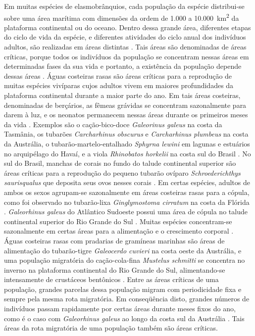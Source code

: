 \documentclass[a4paper,11pt,twoside,showtrims,onecolumn,openright,final]{memoir}
\begin{document}
Em muitas espécies de  elasmobrânquios, cada população da espécie distribui-se sobre uma área 
marítima com dimensões da ordem de 1.000  a 10.000~km\textsuperscript{2} da plataforma continental ou do oceano. 
Dentro dessa grande área, diferentes etapas do ciclo de vida da espécie, e diferentes atividades 
do ciclo anual dos indivíduos adultos, são realizadas 
em áreas distintas \citep{branstetter1990,hoenig1990}. %
Tais áreas são denominadas de áreas críticas, porque todos os indivíduos da população se concentram 
nessas áreas em determinadas fases da sua vida e portanto, a existência da população 
depende dessas áreas \citep{camhi1998}. %
Águas costeiras rasas são áreas críticas para a reprodução de muitas espécies vivíparas cujos 
adultos vivem em maiores profundidades da plataforma continental durante a maior parte do ano. 
Em tais áreas costeiras, denominadas de berçários, as fêmeas grávidas se concentram sazonalmente 
para darem à luz, e os neonatos permanecem nessas áreas durante os primeiros meses da vida \citep{musick2000a}. %
Exemplos são o cação-bico-doce \emph{Galeorinus galeus} na costa da Tasmânia, 
os tubarões \emph{Carcharhinus obscurus} e \emph{Carcharhinus plumbeus} na costa da Austrália, 
o tubarão-martelo-entalhado \emph{Sphyrna lewini} em lagunas e estuários no arquipélago do Havaí, 
e a viola \emph{Rhinobatos horkelii} na costa sul 
do Brasil \citep{simpfendorfer2004}. %
No sul do Brasil, manchas de corais no fundo do talude continental superior são áreas críticas para 
a reprodução do pequeno tubarão ovíparo \emph{Schroederichthys saurisqualus} que deposita seus ovos 
nesses corais \citep{vooren2004b}. %
Em certas espécies, adultos de ambos os sexos agrupam-se sazonalmente em áreas costeiras rasas para 
a cópula, como foi observado no tubarão-lixa \emph{Ginglymostoma cirratum} na costa 
da Flórida \citep{carrier1998}. %
\emph{Galeorhinus galeus} do Atlântico Sudoeste possui uma área de cópula no talude continental 
superior do Rio Grande do Sul \citep{PERES1991}. %
Muitas espécies concentram-se sazonalmente em certas áreas 
para a alimentação e o crescimento corporal \citep{musick2000a}. %
Águas costeiras rasas com pradarias de gramíneas marinhas são áreas de alimentação 
do tubarão-tigre \emph{Galeocerdo cuvieri} na costa oeste da Austrália, e uma população 
migratória do cação-cola-fina \emph{Mustelus schmitti} se concentra no inverno na plataforma 
continental do Rio Grande do Sul, alimentando-se intensamente 
de crustáceos bentônicos \citep{capitoli1995,simpfendorfer2004}. %
Entre as áreas críticas de uma população, grandes parcelas dessa população migram com periodicidade 
fixa e sempre pela mesma rota migratória. Em conseqüência disto, grandes números de indivíduos 
passam rapidamente por certas áreas durante  meses fixos do ano, como é o caso com \emph{Galeorhinus galeus} 
ao longo da costa sul da Austrália  \citep{walker2004}. %
Tais áreas da rota migratória de uma população também são áreas críticas.
\end{document}
